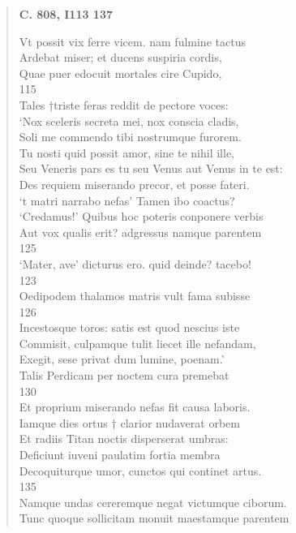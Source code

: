 \documentclass[11pt, a4paper]{report}
\begin{document}
\begin{verse}
    \begin{center} \textbf{C. 808, I113 137} \end{center} \marginpar{[290]} Vt possit vix ferre vicem. nam fulmine tactus \\ Ardebat miser;  \lbrack et \rbrack  ducens suspiria cordis, \\ Quae puer edocuit mortales cire Cupido, \\ 115 \\ Tales †triste feras reddit de pectore voces: \\ ‘Nox sceleris secreta mei, nox conscia cladis, \\ Soli me commendo tibi nostrumque furorem. \\ Tu nosti quid possit amor, sine te nihil ille, \\ Seu Veneris pars es tu seu Venus aut Venus in te est: \\ Des requiem miserando precor, et posse fateri. \\ ‘t matri narrabo nefas’ Tamen ibo coactus? \\ ‘Credamus!’ Quibus hoc poteris conponere verbis \\ Aut vox qualis erit? adgressus namque parentem \\ 125 \\ ‘Mater, ave’ dicturus ero. quid deinde? tacebo! \\ 123 \\ Oedipodem thalamos matris vult fama subisse \\ 126 \\ Incestosque toros: satis est quod nescius iste \\ Commisit, culpamque tulit liecet ille nefandam, \\ Exegit, sese privat dum lumine, poenam.’ \\ Talis Perdicam per noctem cura premebat \\ 130 \\ Et proprium miserando nefas fit causa laboris. \\ Iamque dies ortus † clarior nudaverat orbem \\ Et radiis Titan noctis disperserat umbras: \\ Deficiunt iuveni paulatim fortia membra \\ Decoquiturque umor, cunctos qui continet artus. \\ 135 \\ Namque undas cereremque negat victumque ciborum. \\ Tunc quoque sollicitam monuit maestamque parentem \\ 

\end{verse}
\end{document}
